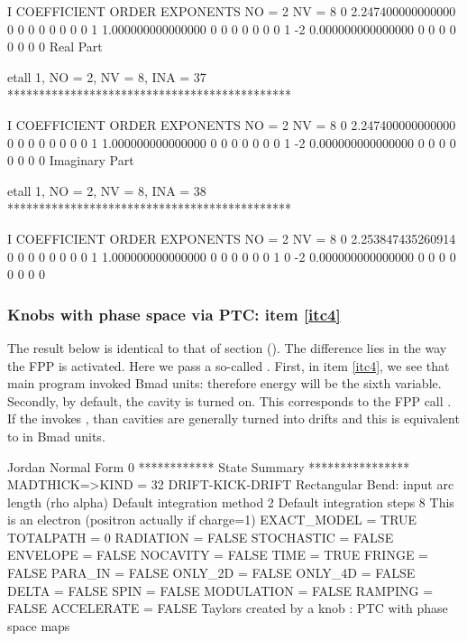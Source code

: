 \documentclass{hitec}     %
\begin{document}
{{{{{{\begin{code}
    I  COEFFICIENT          ORDER   EXPONENTS
      NO =     2      NV =     8
   0   2.247400000000000       0  0  0  0  0  0  0  0
   1   1.000000000000000       0  0  0  0  0  0  0  1
    -2   0.000000000000000       0  0  0  0  0  0  0  0
  Real Part

 etall    1, NO =    2, NV =    8, INA =   37
 *********************************************

    I  COEFFICIENT          ORDER   EXPONENTS
      NO =     2      NV =     8
   0   2.247400000000000       0  0  0  0  0  0  0  0
   1   1.000000000000000       0  0  0  0  0  0  0  1
    -2   0.000000000000000       0  0  0  0  0  0  0  0
  Imaginary Part

 etall    1, NO =    2, NV =    8, INA =   38
 *********************************************

    I  COEFFICIENT          ORDER   EXPONENTS
      NO =     2      NV =     8
   0   2.253847435260914       0  0  0  0  0  0  0  0
   1   1.000000000000000       0  0  0  0  0  0  1  0
    -2   0.000000000000000       0  0  0  0  0  0  0  0
\end{code}
\renewcommand{\codefont}{\small}

 
\subsubsection{Knobs with phase space via PTC: item \ref{itc4}}
\label{s:initwithpsptc}

The result below is identical to that of section (). The difference lies in the way the FPP is activated. Here we pass a so-called .
First, in item \ref{itc4}, we see that main program invoked Bmad units: therefore energy will be the sixth variable. Secondly, by default, the cavity is turned on. This corresponds to the FPP call . If the  invokes , than cavities are generally turned into drifts and this is equivalent to  in Bmad units.

\begin{code}
  Jordan Normal Form            0
 ************ State Summary ****************
 MADTHICK=>KIND =   32  DRIFT-KICK-DRIFT
  Rectangular Bend: input arc length (rho alpha)
  Default integration method     2
  Default integration steps      8
 This is an electron (positron actually if charge=1)
       EXACT_MODEL =  TRUE
       TOTALPATH   =     0
       RADIATION   =  FALSE
       STOCHASTIC  =  FALSE
       ENVELOPE    =  FALSE
       NOCAVITY    =  FALSE
       TIME        =  TRUE
       FRINGE      =  FALSE
       PARA_IN     =  FALSE
       ONLY_2D     =  FALSE
       ONLY_4D     =  FALSE
       DELTA       =  FALSE
       SPIN        =  FALSE
       MODULATION  =  FALSE
       RAMPING     =  FALSE
       ACCELERATE  =  FALSE
 Taylors created by a knob : PTC with phase space maps


\end{code}}}}}}}
\end{document}
